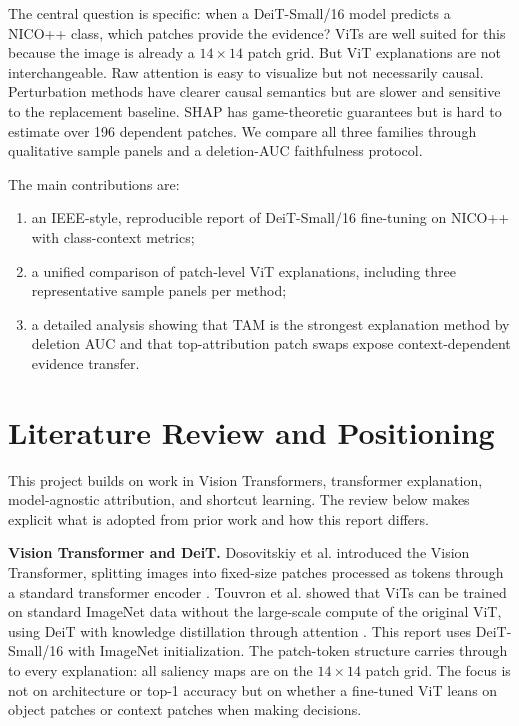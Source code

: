 \documentclass[10pt]{article}
\begin{document}
The central question is specific: when a DeiT-Small/16 model predicts a NICO++ class, which patches provide the evidence? ViTs are well suited for this because the image is already a $14\times14$ patch grid. But ViT explanations are not interchangeable. Raw attention is easy to visualize but not necessarily causal. Perturbation methods have clearer causal semantics but are slower and sensitive to the replacement baseline. SHAP has game-theoretic guarantees but is hard to estimate over 196 dependent patches. We compare all three families through qualitative sample panels and a deletion-AUC faithfulness protocol.

The main contributions are:
\begin{enumerate}
    \item an IEEE-style, reproducible report of DeiT-Small/16 fine-tuning on NICO++ with class-context metrics;
    \item a unified comparison of patch-level ViT explanations, including three representative sample panels per method;
    \item a detailed analysis showing that TAM is the strongest explanation method by deletion AUC and that top-attribution patch swaps expose context-dependent evidence transfer.
\end{enumerate}

\section{Literature Review and Positioning}
\label{sec:lit}
This project builds on work in Vision Transformers, transformer explanation, model-agnostic attribution, and shortcut learning. The review below makes explicit what is adopted from prior work and how this report differs.

\textbf{Vision Transformer and DeiT.} Dosovitskiy et al. introduced the Vision Transformer, splitting images into fixed-size patches processed as tokens through a standard transformer encoder \cite{dosovitskiy2021image}. Touvron et al. showed that ViTs can be trained on standard ImageNet data without the large-scale compute of the original ViT, using DeiT with knowledge distillation through attention \cite{touvron2021training}. This report uses DeiT-Small/16 with ImageNet initialization. The patch-token structure carries through to every explanation: all saliency maps are on the $14\times14$ patch grid. The focus is not on architecture or top-1 accuracy but on whether a fine-tuned ViT leans on object patches or context patches when making decisions.
\end{document}
